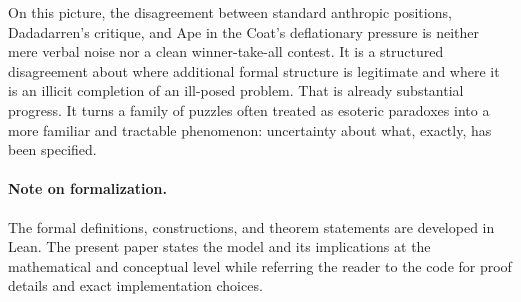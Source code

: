 \documentclass[11pt]{article}
\newcommand{\1}{\mathbf{1}}
\begin{document}
On this picture, the disagreement between standard anthropic positions, Dadadarren's critique, and Ape in the Coat's deflationary pressure is neither mere verbal noise nor a clean winner-take-all contest. It is a structured disagreement about where additional formal structure is legitimate and where it is an illicit completion of an ill-posed problem. That is already substantial progress. It turns a family of puzzles often treated as esoteric paradoxes into a more familiar and tractable phenomenon: uncertainty about what, exactly, has been specified.

\paragraph{Note on formalization.} The formal definitions, constructions, and theorem statements are developed in Lean. The present paper states the model and its implications at the mathematical and conceptual level while referring the reader to the code for proof details and exact implementation choices.
\end{document}
